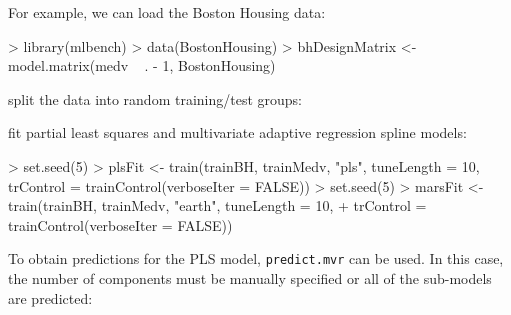 \documentclass[12pt]{article}
\begin{document}
For example, we can load the Boston Housing data:

\begin{small}
\begin{Schunk}
\begin{Sinput}
> library(mlbench)
> data(BostonHousing)
> bhDesignMatrix <- model.matrix(medv ~ . - 1, BostonHousing)
\end{Sinput}
\end{Schunk}
\end{small}

\noindent split the data into random training/test groups:

\begin{small}
\begin{Schunk}
\end{Schunk}
\end{small}

\noindent fit partial least squares and multivariate adaptive regression spline models:

\begin{small}
\begin{Schunk}
\begin{Sinput}
> set.seed(5)
> plsFit <- train(trainBH, trainMedv, "pls", tuneLength = 10, trControl = trainControl(verboseIter = FALSE))
> set.seed(5)
> marsFit <- train(trainBH, trainMedv, "earth", tuneLength = 10, 
+     trControl = trainControl(verboseIter = FALSE))
\end{Sinput}
\end{Schunk}
\end{small}
To obtain predictions  for the PLS model, \texttt{predict.mvr} can be used. In this case, the number of components must be manually specified or all of the sub-models are predicted:
\end{document}
